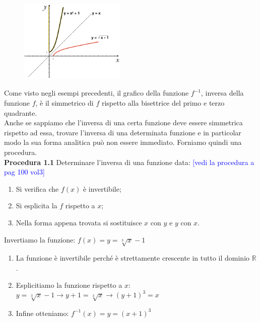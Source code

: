 \begin{esempio}
\begin{itemize}
\begin{figure}[htpb!]
  
  
\includegraphics[width=0.45\textwidth]{img/funz_14c.png} 
  \end{figure}
\end{itemize}
\end{esempio}

Come visto negli esempi precedenti, il grafico della funzione $f^{-1}$, 
inversa della funzione $f$, è il simmetrico di $f$ rispetto alla bisettrice 
del primo e terzo quadrante.\\

Anche se sappiamo che l'inversa di una certa funzione deve essere simmetrica 
rispetto ad essa, trovare l'inversa di una determinata funzione e in 
particolar modo la sua forma analitica può non essere immediato. Forniamo 
quindi una procedura.\\

\textbf{Procedura 1.1} Determinare l'inversa di una funzione data:%
\textcolor{blue}{[vedi la procedura a pag 100 vol3]}
\begin{enumerate}
  \item Si verifica che $f(x)$ è invertibile;
  \item Si esplicita la $f$ rispetto a $x$;
  \item Nella forma appena trovata si sostituisce $x$ con $y$ e $y$ con 
$x$.
\end{enumerate}
  
\begin{esempio}
Invertiamo la funzione: $f(x)=y=\sqrt[3]{x}-1$
\begin{enumerate}
  \item La funzione è invertibile perché è strettamente crescente in 
tutto il dominio $\mathbb{R}$.
  \item Esplicitiamo la funzione rispetto a $x$:\\
   $y=\sqrt[3]{x}-1\rightarrow y+1=\sqrt[3]{x}\rightarrow(y+1)^3=x$
  \item Infine otteniamo: $f^{-1}(x)=y=(x+1)^3$
\end{enumerate}
\end{esempio}

